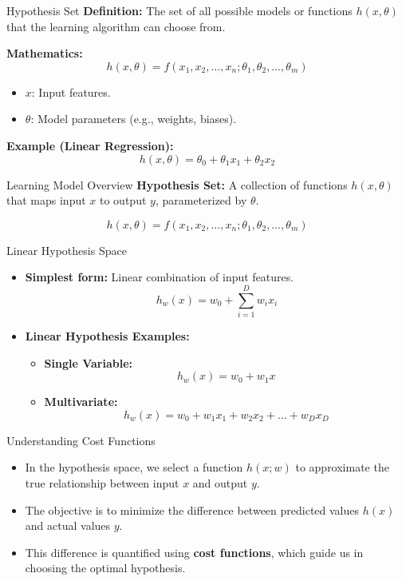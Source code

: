\documentclass[serif, aspectratio=169]{beamer}
\begin{document}
\begin{frame}{Hypothesis Set}
    \textbf{Definition:} The set of all possible models or functions \( h(x, \theta) \) that the learning algorithm can choose from.

    \vspace{0.3cm}
    \textbf{Mathematics:}
    \[
    h(x, \theta) = f(x_1, x_2, \dots, x_n; \theta_1, \theta_2, \dots, \theta_m)
    \]
    \begin{itemize}
        \item \( x \): Input features.
        \item \( \theta \): Model parameters (e.g., weights, biases).
    \end{itemize}

    \vspace{0.3cm}
    \textbf{Example (Linear Regression):}
    \[
    h(x, \theta) = \theta_0 + \theta_1 x_1 + \theta_2 x_2
    \]
\end{frame}


\begin{frame}{Learning Model Overview}
	\textbf{Hypothesis Set:}  
	A collection of functions \( h(x, \theta) \) that maps input \( x \) to output \( y \), parameterized by \( \theta \).
	
	\[
	h(x, \theta) = f(x_1, x_2, \dots, x_n; \theta_1, \theta_2, \dots, \theta_m)
	\]
\end{frame}

\begin{frame}{Linear Hypothesis Space}
    \begin{itemize}
        \item \textbf{Simplest form:} Linear combination of input features.
        \[
        h_w(x) = w_0 + \sum_{i=1}^{D} w_i x_i
        \]

        \item \textbf{Linear Hypothesis Examples:}
        \begin{itemize}
            \item \textbf{Single Variable:} 
            \[
            h_w(x) = w_0 + w_1 x
            \]
            \item \textbf{Multivariate:} 
            \[
            h_w(x) = w_0 + w_1 x_1 + w_2 x_2 + \dots + w_D x_D
            \]
        \end{itemize}
    \end{itemize}
\end{frame}

\begin{frame}{Understanding Cost Functions}
    \begin{itemize}
        \item In the hypothesis space, we select a function \( h(x; w) \) to approximate the true relationship between input \( x \) and output \( y \).
        \item The objective is to minimize the difference between predicted values \( h(x) \) and actual values \( y \).
        \item This difference is quantified using \textbf{cost functions}, which guide us in choosing the optimal hypothesis.
    \end{itemize}
\end{frame}
\end{document}
